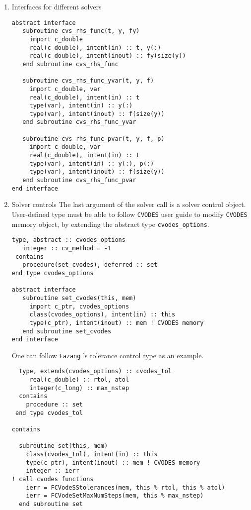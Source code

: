 \documentclass[12pt, reqno, oneside]{amsbook}
\numberwithin{equation}{chapter}
\begin{document}
\begin{enumerate}
\item Interfaces for different solvers
\label{sec:org040f879}
\begin{verbatim}
abstract interface
   subroutine cvs_rhs_func(t, y, fy)
     import c_double
     real(c_double), intent(in) :: t, y(:)
     real(c_double), intent(inout) :: fy(size(y))
   end subroutine cvs_rhs_func

   subroutine cvs_rhs_func_yvar(t, y, f)
     import c_double, var
     real(c_double), intent(in) :: t
     type(var), intent(in) :: y(:)
     type(var), intent(inout) :: f(size(y))
   end subroutine cvs_rhs_func_yvar

   subroutine cvs_rhs_func_pvar(t, y, f, p)
     import c_double, var
     real(c_double), intent(in) :: t
     type(var), intent(in) :: y(:), p(:)
     type(var), intent(inout) :: f(size(y))
   end subroutine cvs_rhs_func_pvar
end interface
\end{verbatim}

\item Solver controls
\label{sec:org572e26b}
The last argument of the solver call is a solver control
object. User-defined type must be able to follow \texttt{CVODES} user guide
to modify \texttt{CVODES} memory object, by extending the abstract type \texttt{cvodes\_options}.
\begin{verbatim}
type, abstract :: cvodes_options
   integer :: cv_method = -1
 contains
   procedure(set_cvodes), deferred :: set
end type cvodes_options

abstract interface
   subroutine set_cvodes(this, mem)
     import c_ptr, cvodes_options
     class(cvodes_options), intent(in) :: this
     type(c_ptr), intent(inout) :: mem ! CVODES memory
   end subroutine set_cvodes
end interface
\end{verbatim}
One can follow \texttt{Fazang} 's tolerance control type as an example.
\begin{verbatim}
  type, extends(cvodes_options) :: cvodes_tol
     real(c_double) :: rtol, atol
     integer(c_long) :: max_nstep
  contains
    procedure :: set
 end type cvodes_tol

contains

  subroutine set(this, mem)
    class(cvodes_tol), intent(in) :: this
    type(c_ptr), intent(inout) :: mem ! CVODES memory
    integer :: ierr
! call cvodes functions
    ierr = FCVodeSStolerances(mem, this % rtol, this % atol)
    ierr = FCVodeSetMaxNumSteps(mem, this % max_nstep)
  end subroutine set
\end{verbatim}
\end{enumerate}
\end{document}
